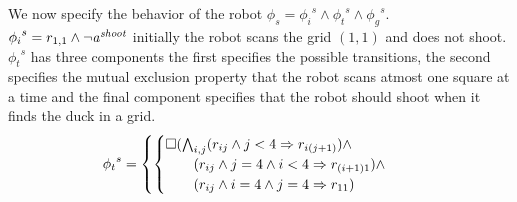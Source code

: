 We now specify the behavior of the robot $\phi_s = {\phi_i}^s \wedge {\phi_t}^s \wedge {\phi_g}^s$.
${\phi_i}^s = r_{1,1} \wedge \neg \mathit{a^{shoot}}$ initially the robot scans the grid $(1,1)$ and does not shoot.
${\phi_t}^s$ has three components the first specifies the possible transitions, the second specifies the
mutual exclusion property that the robot scans atmost one square at a time and the final component 
specifies that the robot should shoot when it finds the duck in a grid.
%
\begin{align}
{\phi_t}^s = 
\begin{cases}
\begin{cases}
\square (\bigwedge_{i,j} (r_{ij} \wedge j < 4 \Rightarrow r_{i(j+1)}) \wedge  \\
\qquad (r_{ij} \wedge j=4 \wedge i<4 \Rightarrow r_{(i+1)1}) \wedge  \\
\qquad (r_{ij} \wedge i=4 \wedge j=4 \Rightarrow r_{11}) 
\end{cases} \\

\end{cases}
\end{align}
